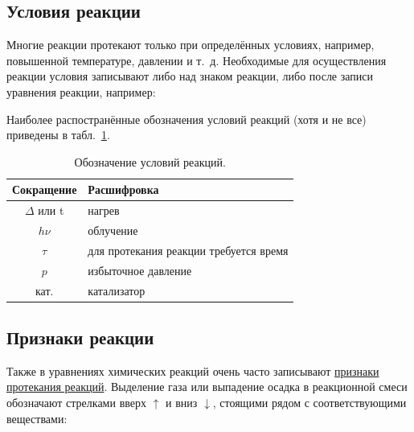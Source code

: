 
\subsection*{Условия реакции}\label{sec:reaction_conditions}

Многие реакции протекают только при определённых условиях, например, повышенной температуре, давлении и т.~д. Необходимые для осуществления реакции условия записывают либо над знаком реакции, либо после записи уравнения реакции, например:


Наиболее распостранённые обозначения условий реакций (хотя и не все) приведены в табл.~\ref{tab:designation_of_reaction_conditions}.

\begin{table}[htbp]
    \small
    \caption{Обозначение условий реакций.}
    \label{tab:designation_of_reaction_conditions}
    \centering
    \begin{tabular}{cl}
        \hline
        \rowcolor{table_header}Сокращение & Расшифровка \\
        \hline
        $\Delta$ или t & нагрев \\
        $h\nu$ & облучение \\
        $\tau$  & для протекания реакции требуется время \\
        $p$ & избыточное давление \\
        кат. & катализатор \\
        \hline
    \end{tabular}
\end{table}

\subsection*{Признаки реакции}

Также в уравнениях химических реакций очень часто записывают \hyperref[term:signs_of_a_chemical_reaction]{признаки протекания реакций}. Выделение газа или выпадение осадка в реакционной смеси обозначают стрелками вверх $\uparrow$ и вниз $\downarrow$, стоящими рядом с соответствующими веществами:

